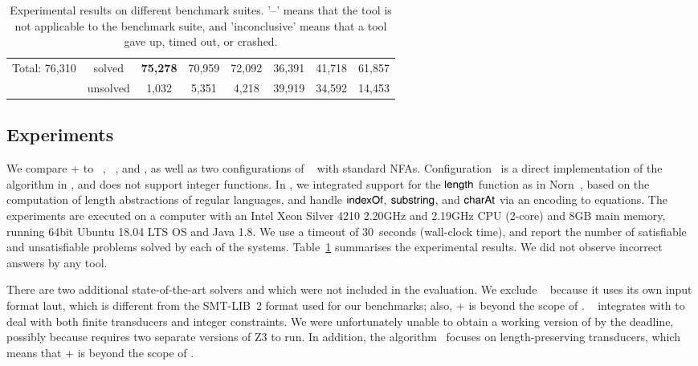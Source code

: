 \begin{table}[tbp]
\begin{center}
\begin{tabular}{|c|c|*{6}{c|}}
\hline 
\hline
\multirow{2}{*}{Total: 76,310} & \cellcolor{Gray} solved & \cellcolor{Gray}\bf{75,278}  & \cellcolor{Gray}70,959 & \cellcolor{Gray}72,092 & \cellcolor{Gray}36,391 & \cellcolor{Gray}41,718 & \cellcolor{Gray}61,857\\
\cline{2-8}
 &  unsolved &1,032  & 5,351  & 4,218 & 39,919 & 34,592 &14,453  \\
\hline
\end{tabular}
\end{center}
\caption{Experimental results on different benchmark suites.  '--' means that the tool is not applicable to the benchmark suite, and 'inconclusive' means that a tool gave up, timed out, or crashed.}
\label{tab-experiment}\vspace{-6mm}
\end{table}%


\subsection{Experiments}\label{sec:exp-res}

We compare {\ostrich}+ to {\cvc}~\cite{cvc4}, {\zthree}~\cite{Z3-str},
and {\zthreetrau} \cite{Z3-trau}, as well as two configurations of
\ostrich~\cite{CHL+19} with standard NFAs. Configuration \ostrichi\ is
a direct implementation of the algorithm in \cite{CHL+19}, and does
not support integer functions. In \ostrichii, we integrated support
for the $\mathsf{length}$ function as in Norn~\cite{Abdulla14}, based on the
computation of length abstractions of regular languages, and handle
$\mathsf{indexOf}$, $\mathsf{substring}$, and $\mathsf{charAt}$ via an encoding to equations.
%
The experiments are executed on a computer with an Intel Xeon Silver 4210 2.20GHz and 2.19GHz CPU (2-core) and 8GB main memory, running 64bit Ubuntu 18.04 LTS OS and Java 1.8. We use a timeout of 30~seconds (wall-clock time), and report the number of satisfiable and unsatisfiable problems solved by each of the systems. Table~\ref{tab-experiment} summarises the experimental results. We did not observe incorrect answers by any tool.

There are two additional state-of-the-art solvers  {\slent} and {\trauplus} which were not included in
the evaluation. We exclude {\slent}~\cite{WC+18} because it uses its own input format laut, which is different from the SMT-LIB~2 format used for our
benchmarks; also, {\transducerbench+} is beyond the scope of {\slent}.
%
{\trauplus}~\cite{AbdullaA+19}  integrates {\trau} with {\sloth} to deal with both finite transducers and integer constraints. We were unfortunately unable
to obtain a working version of {\trauplus} by the deadline, possibly because {\trau} requires two separate versions of Z3 to run. In addition, the algorithm~\cite{AbdullaA+19} focuses on length-preserving transducers, which means that {\transducerbench}+ is beyond the scope of \trauplus.

